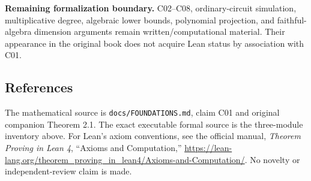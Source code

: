 \documentclass[11pt,letterpaper]{article}
\newcommand{\pathref}[1]{{\small\nolinkurl{#1}}}
\begin{document}
\textbf{Remaining formalization boundary.} C02--C08, ordinary-circuit simulation, multiplicative degree, algebraic lower bounds, polynomial projection, and faithful-algebra dimension arguments remain written/computational material. Their appearance in the original book does not acquire Lean status by association with C01.

\subsection*{References}
The mathematical source is \pathref{docs/FOUNDATIONS.md}, claim C01 and original companion Theorem 2.1. The exact executable formal source is the three-module inventory above. For Lean's axiom conventions, see the official manual, \emph{Theorem Proving in Lean 4}, ``Axioms and Computation,'' \url{https://lean-lang.org/theorem_proving_in_lean4/Axioms-and-Computation/}. No novelty or independent-review claim is made.
\end{document}
